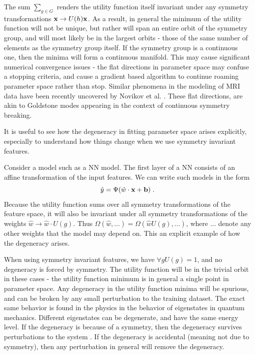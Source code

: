 \documentclass[twocolumn, nofootinbib, aps, prb]{revtex4-1}
\begin{document}
The sum $\sum_{g \in G}$ renders the utility function itself invariant under any symmetry transformations ${\bf x} \rightarrow U(h) {\bf x}$. As a result, in general the minimum of the utility function will not be unique, but rather will span an entire orbit of the symmetry group, and will most likely be in the largest orbits - those of the same number of elements as the symmetry group itself. If the symmetry group is a continuous one, then the minima will form a continuous manifold. This may cause significant numerical convergence issues - the flat directions in parameter space may confuse a stopping criteria, and cause a gradient based algorithm to continue roaming parameter space rather than stop. Similar phenomena in the modeling of MRI data have been recently uncovered by Novikov et al. . These flat directions, are akin to Goldstone modes appearing in the context of continuous symmetry breaking\cite{nambu1960quasi, goldstone1961field, goldstone1962broken}.

It is useful to see how the degeneracy in fitting parameter space arises explicitly, especially to understand how things change when we use symmetry invariant features.

Consider a model such as a NN model. The first layer of a NN consists of an affine transformation of the input features. We can write such models in the form
\begin{equation}
{\hat y} = \Psi( {\hat w} \cdot {\bf x} + {\bf b})
\; .
\end{equation}
Because the utility function sums over all symmetry transformations of the feature space, it will also be invariant under all symmetry transformations of the weights ${\hat w} \rightarrow {\hat w} \cdot U(g)$. Thus $\Omega({\hat w}, \ldots) = \Omega({\hat w} U(g), \ldots)$, where $\ldots$ denote any other weights that the model may depend on. This an explicit example of how the degeneracy arises. 

When using symmetry invariant features, we have $\forall g U(g) = 1$, and no degeneracy is forced by symmetry. The utility function will be in the trivial orbit in these cases - the utility function minimum is in general a single point in parameter space. Any degeneracy in the utility function minima will be spurious, and can be broken by any small perturbation to the training dataset. The exact same behavior is found in the physics in the behavior of eigenstates in quantum mechanics. Different eigenstates can be degenerate, and have the same energy level. If the degeneracy is because of a symmetry, then the degeneracy survives perturbations to the system . If the degeneracy is accidental (meaning not due to symmetry), then any perturbation in general will remove the degeneracy.
\end{document}
